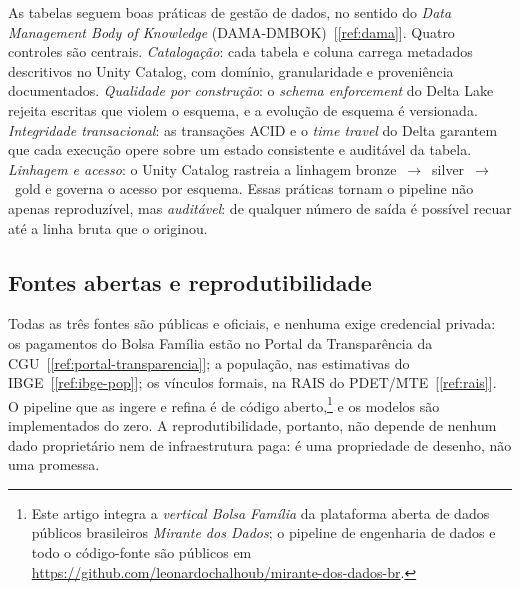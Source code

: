 \documentclass[12pt,a4paper,oneside]{article}
\newcommand{\C}[1]{[\ref{#1}]}
\begin{document}
As tabelas seguem boas práticas de gestão de dados, no sentido do
\emph{Data Management Body of Knowledge} (DAMA-DMBOK)~\C{ref:dama}. Quatro
controles são centrais. \emph{Catalogação}: cada tabela e coluna carrega
metadados descritivos no Unity Catalog, com domínio, granularidade e
proveniência documentados. \emph{Qualidade por construção}: o
\emph{schema enforcement} do Delta Lake rejeita escritas que violem o
esquema, e a evolução de esquema é versionada. \emph{Integridade
transacional}: as transações ACID e o \emph{time travel} do Delta garantem
que cada execução opere sobre um estado consistente e auditável da tabela.
\emph{Linhagem e acesso}: o Unity Catalog rastreia a linhagem
bronze~$\to$~silver~$\to$~gold e governa o acesso por esquema. Essas
práticas tornam o pipeline não apenas reproduzível, mas \emph{auditável}:
de qualquer número de saída é possível recuar até a linha bruta que o
originou.

\subsection{Fontes abertas e reprodutibilidade}
\label{sec:reprod}

Todas as três fontes são públicas e oficiais, e nenhuma exige credencial
privada: os pagamentos do Bolsa Família estão no Portal da Transparência
da CGU~\C{ref:portal-transparencia}; a população, nas estimativas do
IBGE~\C{ref:ibge-pop}; os vínculos formais, na RAIS do
PDET/MTE~\C{ref:rais}. O pipeline que as ingere e refina é de código
aberto,\footnote{Este artigo integra a \emph{vertical Bolsa Família} da
plataforma aberta de dados públicos brasileiros \emph{Mirante dos Dados};
o pipeline de engenharia de dados e todo o código-fonte são públicos em
\url{https://github.com/leonardochalhoub/mirante-dos-dados-br}.} e os
modelos são implementados do zero. A reprodutibilidade, portanto, não
depende de nenhum dado proprietário nem de infraestrutura paga: é uma
propriedade de desenho, não uma promessa.
\end{document}
